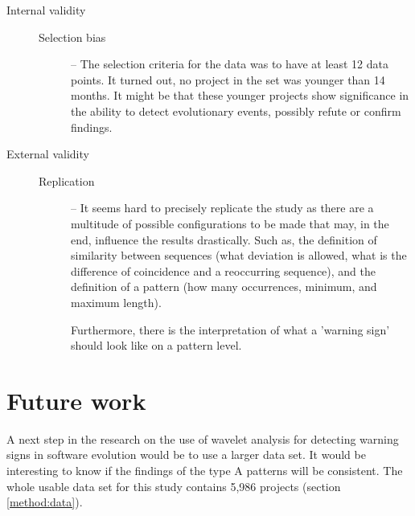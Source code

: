 \begin{description}
\begin{description}
\begin{comment}
		\item[Sample size.] \hspace{1em} For this study, a set of 250 projects is
			used. Is this enough to generalise the results to the world of OSS projects.

		\item[Time resolution.] \hspace{1em} Is monthly aggregated data fine-grained
			enough?
	\end{comment}
	\end{description}

	\item[Internal validity] \hfill

	\begin{description}
		\item[\rm{Selection bias}] -- The selection criteria for the data was to have
			at least 12 data points. It turned out, no project in the set was younger
			than 14 months. It might be that these younger projects show significance in
			the ability to detect evolutionary events, possibly refute or confirm
			findings.
	\end{description}

	\item[External validity] \hfill

	\begin{description}
		\item[\rm{Replication}] -- It seems hard to precisely replicate the study
			as there are a multitude of possible configurations to be made that may, in
			the end, influence the results drastically. Such as, the definition of
			similarity between sequences (what deviation is allowed, what is the
			difference of coincidence and a reoccurring sequence), and the definition of
			a pattern (how many occurrences, minimum, and maximum length).
			
			Furthermore, there is the interpretation of what a 'warning sign' should
			look like on a pattern level.
	\end{description}
\end{description}

\section{Future work}
A next step in the research on the use of wavelet analysis for detecting
warning signs in software evolution would be to use a larger data set. It would
be interesting to know if the findings of the type A patterns will be
consistent. The whole usable data set for this study contains 5,986 projects
(section \ref{method:data}).

